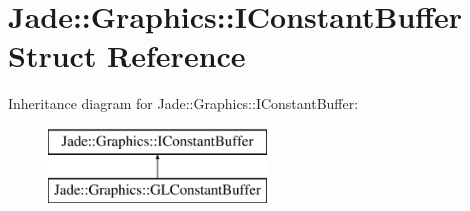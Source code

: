 \hypertarget{struct_jade_1_1_graphics_1_1_i_constant_buffer}{}\section{Jade\+:\+:Graphics\+:\+:I\+Constant\+Buffer Struct Reference}
\label{struct_jade_1_1_graphics_1_1_i_constant_buffer}
Inheritance diagram for Jade\+:\+:Graphics\+:\+:I\+Constant\+Buffer\+:\begin{figure}[H]
\begin{center}
\leavevmode
\includegraphics[height=2.000000cm]{struct_jade_1_1_graphics_1_1_i_constant_buffer}
\end{center}
\end{figure}
